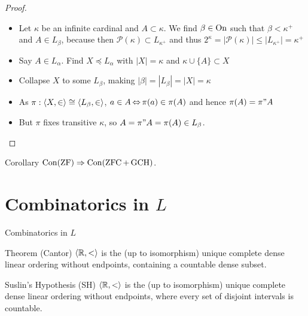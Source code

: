 \begin{frame}
	\begin{proof}
		\begin{itemize}
			\item Let $\kappa$ be an infinite cardinal and $A\subset\kappa$. We find $\beta\in\operatorname{On}$ such that $\beta<\kappa^+$ and $A\in L_\beta$, because then $\mathcal{P}(\kappa)\subset L_{\kappa^+}$ and thus $2^\kappa=|\mathcal{P}(\kappa)|\leq |L_{\kappa^+}|=\kappa^+$
			\pause\item Say $A\in L_\alpha$. Find $X\preceq L_\alpha$ with $|X|=\kappa$ and $\kappa\cup\{A\}\subset X$
			\pause\item Collapse $X$ to some $L_\beta$, making $|\beta|=|L_\beta|=|X|=\kappa$
			\pause\item As $\pi:\langle X,\in\rangle\cong\langle L_\beta,\in\rangle$, $a\in A\operatorname{\Leftrightarrow}\pi(a)\in\pi(A)$ and hence $\pi(A)=\pi"A$
			\pause\item But $\pi$ fixes transitive $\kappa$, so $A=\pi"A=\pi(A)\in L_\beta$.
		\end{itemize}
	\end{proof}
	
	\pause\begin{block}{Corollary}
		$\operatorname{Con}(\operatorname{ZF})\Rightarrow\operatorname{Con}(\operatorname{ZFC}+\operatorname{GCH})$.
	\end{block}
\end{frame}


\section[Combinatorics in $L$]{Combinatorics in $L$}
\begin{frame}{Combinatorics in $L$}
	\begin{block}{Theorem (Cantor)}
		$\langle \mathbb{R},<\rangle$ is the (up to isomorphism) unique complete dense linear ordering without endpoints, containing a countable dense subset.
	\end{block}
	
	\pause\begin{block}{Suslin's Hypothesis (SH)}
		$\langle \mathbb{R},<\rangle$ is the (up to isomorphism) unique complete dense linear ordering without endpoints, where every set of disjoint intervals is countable.
	\end{block}
\end{frame}

